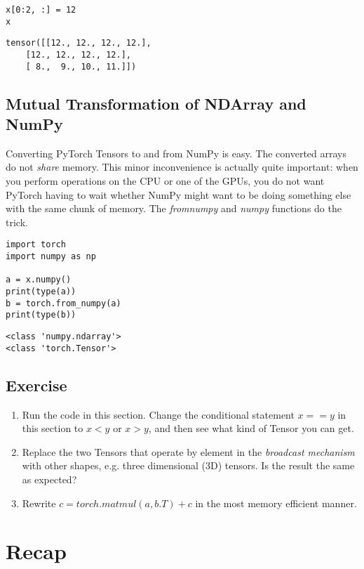 \documentclass[]{article}
\begin{document}
\begin{verbatim}
x[0:2, :] = 12
x
\end{verbatim}

\begin{verbatim}
tensor([[12., 12., 12., 12.],
	[12., 12., 12., 12.],
	[ 8.,  9., 10., 11.]])
\end{verbatim}

\subsection{Mutual Transformation of NDArray and NumPy}

Converting PyTorch Tensors to and from NumPy is easy. The converted arrays do not \textit{share} memory. This minor inconvenience is actually quite important: when you perform operations on the CPU or one of the GPUs, you do not want PyTorch having to wait whether NumPy might want to be doing something else with the same chunk of memory. The \textit{from\textunderscore numpy} and \textit{numpy} functions do the trick.

\begin{verbatim}
import torch
import numpy as np

a = x.numpy()
print(type(a))
b = torch.from_numpy(a)
print(type(b))
\end{verbatim}

\begin{verbatim}
<class 'numpy.ndarray'>
<class 'torch.Tensor'>
\end{verbatim}

\subsection{Exercise}

\begin{enumerate}
	\item Run the code in this section. Change the conditional statement $ x == y $ in this section to $ x < y $ or $ x > y $, and then see what kind of Tensor you can get.
	\item Replace the two Tensors that operate by element in the \textit{broadcast mechanism} with other shapes, e.g. three dimensional (3D) tensors. Is the result the same as expected?
	\item Rewrite $ c = torch.matmul(a, b.T) + c $ in the most memory efficient manner.
\end{enumerate}

\section{Recap}


\nocite{*}

\printbibliography
\end{document}
